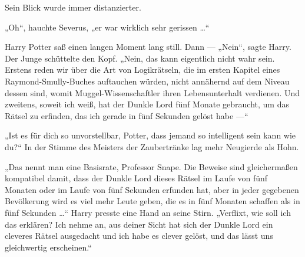 Sein Blick wurde immer distanzierter.

„Oh“, hauchte Severus, „er war wirklich sehr gerissen …“

Harry Potter saß einen langen Moment lang still. Dann —
„Nein“, sagte Harry. Der Junge schüttelte den Kopf.
„Nein, das kann eigentlich nicht wahr sein. Erstens reden wir über die Art von Logikrätseln, die im ersten Kapitel eines Raymond-Smully-Buches auftauchen würden, nicht annähernd auf dem Niveau dessen sind, womit Muggel-Wissenschaftler ihren Lebensunterhalt verdienen. Und zweitens, soweit ich weiß, hat der Dunkle Lord fünf Monate gebraucht, um das Rätsel zu erfinden, das ich gerade in fünf Sekunden gelöst habe —“

„Ist es für dich so unvorstellbar, Potter, dass jemand so intelligent sein kann wie du?“ In der Stimme des Meisters der Zaubertränke lag mehr Neugierde als Hohn.

„Das nennt man eine Basisrate, Professor Snape. Die Beweise sind gleichermaßen kompatibel damit, dass der Dunkle Lord dieses Rätsel im Laufe von fünf Monaten oder im Laufe von fünf Sekunden erfunden hat, aber in jeder gegebenen Bevölkerung wird es viel mehr Leute geben, die es in fünf Monaten schaffen als in fünf Sekunden …“ Harry presste eine Hand an seine Stirn.
„Verflixt, wie soll ich das erklären? Ich nehme an, aus deiner Sicht hat sich der Dunkle Lord ein cleveres Rätsel ausgedacht und ich habe es clever gelöst, und das lässt uns gleichwertig erscheinen.“

